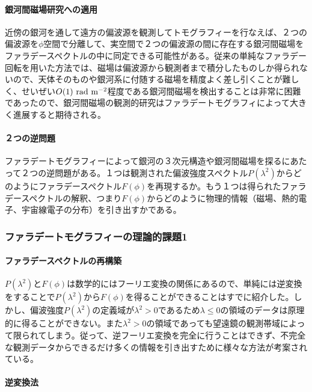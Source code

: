 \paragraph{銀河間磁場研究への適用}

近傍の銀河を通して遠方の偏波源を観測してトモグラフィーを行なえば、２つの偏波源を$\phi$空間で分離して、実空間で２つの偏波源の間に存在する銀河間磁場をファラデースペクトルの中に同定できる可能性がある\citep{2014PASJ...66...65A}。従来の単純なファラデー回転を用いた方法では、磁場は偏波源から観測者まで積分したものしか得られないので、天体そのものや銀河系に付随する磁場を精度よく差し引くことが難しく、せいぜい$O(1)~{\rm rad~m^{-2}}$程度である銀河間磁場を検出することは非常に困難であったので、銀河間磁場の観測的研究はファラデートモグラフィによって大きく進展すると期待される。

\paragraph{２つの逆問題}

ファラデートモグラフィーによって銀河の３次元構造や銀河間磁場を探るにあたって２つの逆問題がある。１つは観測された偏波強度スペクトル$P(\lambda^2)$からどのようにファラデースペクトル$F(\phi)$を再現するか。もう１つは得られたファラデースペクトルの解釈、つまり$F(\phi)$からどのように物理的情報（磁場、熱的電子、宇宙線電子の分布）を引き出すかである。

\subsubsection{ファラデートモグラフィーの理論的課題1}
\label{c06.s1.ss8.sss2}

\paragraph{ファラデースペクトルの再構築}

$P(\lambda^2)$と$F(\phi)$は数学的にはフーリエ変換の関係にあるので、単純には逆変換をすることで$P(\lambda^2)$から$F(\phi)$を得ることができることはすでに紹介した。しかし、偏波強度$P(\lambda^2)$の定義域が$\lambda^2 > 0$であるため$\lambda \leq 0$の領域のデータは原理的に得ることができない。また$\lambda^2 > 0$の領域であっても望遠鏡の観測帯域によって限られてしまう。従って、逆フーリエ変換を完全に行うことはできず、不完全な観測データからできるだけ多くの情報を引き出すために様々な方法が考案されている。

\paragraph{逆変換法}

